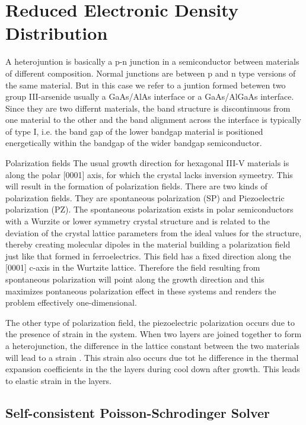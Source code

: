 \chapter{Reduced Electronic Density Distribution} \label{ED}

A heterojuntion is basically a p-n junction in a semiconductor between
materials of different composition. Normal junctions are between p and n type
versions of the same material. But in this case we refer to a juntion formed
betewen two group III-arsenide usually a GaAs/AlAs interface or a GaAs/AlGaAs
interface. Since they are two differnt materials, the band structure is
discontinuous from one material to the other and the band alignment across the
interface is typically of type I, i.e. the band gap of the lower bandgap
material is positioned energetically within the bandgap of the wider bandgap
semiconductor.

Polarization fields 
The usual growth direction for hexagonal III-V materials is
along the polar [0001] axis, for which the crystal lacks inversion symeetry.
This will result in the formation of polarization fields. There are two kinds
of polarization fields. They are spontaneous polarization (SP) and
Piezoelectric polarization (PZ).  The spontaneous polarization exists in polar
semiconductors with a Wurzite or lower symmetry crystal structure and is
related to the deviation of the crystal lattice parameters from the ideal
values for the structure, thereby creating molecular dipoles in the material
building a polarization field just like that formed in ferroelectrics. This
field has a fixed direction along the [0001] c-axis in the Wurtzite lattice.
Therefore the field resulting from spontaneous polarization will point along
the growth direction and this maximizes pontaneous polarization effect in these
systems and renders the problem effectively one-dimensional.  

The other type of polarization field, the piezoelectric polarization occurs due
to the presence of strain in the system. When two layers are joined together to
form a heterojunction, the difference in the lattice constant between the two
materials will lead to a strain . This strain also occurs due tot he difference
in the thermal expansion coefficients in the the layers during cool down after
growth. This leads to elastic strain in the layers. 

\section{Self-consistent Poisson-Schrodinger Solver} \label{sec:model}

